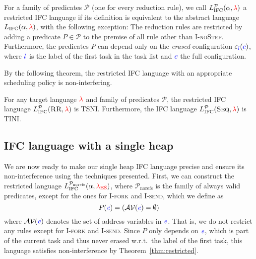 \documentclass{sigplanconf}
\newcommand{\Varid}[1]{\mathit{#1}}
\newcommand{\Red}[1]{{\color{red} #1}}
\begin{document}


\begin{definition}
  \label{def:restricted}
  For a family of predicates $\mathcal P$ (one for every reduction
  rule), we call
  \ensuremath{L_\text{IFC}^{\mathcal{P}}(\alpha,\Red{\lambda})} a restricted IFC language
  if its definition is equivalent to the abstract language
  \ensuremath{L_\text{IFC}(\alpha,\Red{\lambda})}, with the following exception:
  The reduction rules are restricted
  by adding a predicate $P \in \mathcal P$ to the premise of
  all rule other than \textsc{I-noStep}.  Furthermore, the predicates $P$
  can depend only on the \textit{erased} configuration
  \ensuremath{\varepsilon_{\ifc{l}}(\ifc{c})}, where \ensuremath{\ifc{l}} is the label of the first task
  in the task list and \ensuremath{\ifc{c}} the full configuration.
\end{definition}

By the following theorem, the restricted IFC language with an
appropriate scheduling policy is non-interfering.

\begin{theorem}
  \label{thm:restricted}
  For any target language \ensuremath{\Red{\lambda}} and family of predicates
  $\mathcal{P}$, the restricted IFC language \ensuremath{L_\text{IFC}^{\mathcal{P}}(\textsc{RR},\Red{\lambda})}
  is TSNI.  Furthermore, the IFC language
  \ensuremath{L_\text{IFC}^{\mathcal{P}}(\textsc{Seq},\Red{\lambda})} is TINI.
\end{theorem}


\subsection{IFC language with a single heap}

We are now ready to make our single heap IFC language precise and
ensure its non-interference using the techniques presented.
First, we can construct the restricted language
\ensuremath{L_\text{IFC}^{\mathcal{P}_\text{norefs}}(\alpha,\Red{\lambda_{\text{ES}}})}, where \ensuremath{\mathcal{P}_\text{norefs}} is
the family of always valid predicates, except for the ones for
\textsc{I-fork} and \textsc{I-send}, which we define as
\[ P(\ensuremath{\ifc{\Varid{e}}}) = (\mathcal{AV}(\ensuremath{\ifc{\Varid{e}}}) = \emptyset{}) \]
where $\mathcal{AV}(\ensuremath{\ifc{\Varid{e}}})$ denotes the set of address variables in \ensuremath{\ifc{\Varid{e}}}.
That is, we do not restrict any rules except for \textsc{I-fork}
and \textsc{I-send}.
Since $P$ only depends on \ensuremath{\ifc{\Varid{e}}}, which is part of the current
task and thus never erased w.r.t.\ the label of the first task,
this language satisfies non-interference by Theorem~\ref{thm:restricted}.
\end{document}
